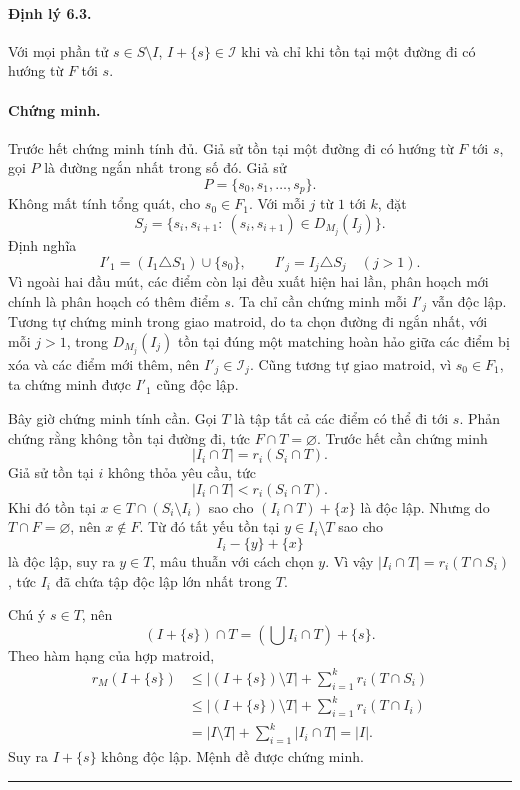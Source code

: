 \documentclass[11pt]{article}
\newcommand{\qedmark}{\hfill\rule{0.7ex}{0.7ex}}
\begin{document}
\paragraph{Định lý 6.3.}
Với mọi phần tử \(s\in S\setminus I\), \(I+\{s\}\in\mathcal I\) khi và chỉ khi
tồn tại một đường đi có hướng từ \(F\) tới \(s\).

\paragraph{Chứng minh.}
Trước hết chứng minh tính đủ. Giả sử tồn tại một đường đi có hướng từ \(F\) tới
\(s\), gọi \(P\) là đường ngắn nhất trong số đó. Giả sử
\[
  P=\{s_0,s_1,\ldots,s_p\}.
\]
Không mất tính tổng quát, cho \(s_0\in F_1\). Với mỗi \(j\) từ \(1\) tới \(k\),
đặt
\[
  S_j=\{s_i,s_{i+1}:\ (s_i,s_{i+1})\in D_{M_j}(I_j)\}.
\]
Định nghĩa
\[
  I'_1=(I_1\triangle S_1)\cup\{s_0\},\qquad
  I'_j=I_j\triangle S_j\quad(j>1).
\]
Vì ngoài hai đầu mút, các điểm còn lại đều xuất hiện hai lần, phân hoạch mới
chính là phân hoạch có thêm điểm \(s\). Ta chỉ cần chứng minh mỗi \(I'_j\) vẫn
độc lập. Tương tự chứng minh trong giao matroid, do ta chọn đường đi ngắn nhất,
với mỗi \(j>1\), trong \(D_{M_j}(I_j)\) tồn tại đúng một matching hoàn hảo giữa
các điểm bị xóa và các điểm mới thêm, nên \(I'_j\in\mathcal I_j\). Cũng tương tự
giao matroid, vì \(s_0\in F_1\), ta chứng minh được \(I'_1\) cũng độc lập.

Bây giờ chứng minh tính cần. Gọi \(T\) là tập tất cả các điểm có thể đi tới
\(s\). Phản chứng rằng không tồn tại đường đi, tức \(F\cap T=\varnothing\).
Trước hết cần chứng minh
\[
  |I_i\cap T|=r_i(S_i\cap T).
\]
Giả sử tồn tại \(i\) không thỏa yêu cầu, tức
\[
  |I_i\cap T|<r_i(S_i\cap T).
\]
Khi đó tồn tại \(x\in T\cap(S_i\setminus I_i)\) sao cho
\((I_i\cap T)+\{x\}\) là độc lập. Nhưng do \(T\cap F=\varnothing\), nên
\(x\notin F\). Từ đó tất yếu tồn tại \(y\in I_i\setminus T\) sao cho
\[
  I_i-\{y\}+\{x\}
\]
là độc lập, suy ra \(y\in T\), mâu thuẫn với cách chọn \(y\). Vì vậy
\(|I_i\cap T|=r_i(T\cap S_i)\), tức \(I_i\) đã chứa tập độc lập lớn nhất trong
\(T\).

Chú ý \(s\in T\), nên
\[
  (I+\{s\})\cap T=\left(\bigcup I_i\cap T\right)+\{s\}.
\]
Theo hàm hạng của hợp matroid,
\[
\begin{aligned}
r_M(I+\{s\})
  &\le |(I+\{s\})\setminus T|+\sum_{i=1}^k r_i(T\cap S_i)\\
  &\le |(I+\{s\})\setminus T|+\sum_{i=1}^k r_i(T\cap I_i)\\
  &= |I\setminus T|+\sum_{i=1}^k |I_i\cap T|=|I|.
\end{aligned}
\]
Suy ra \(I+\{s\}\) không độc lập. Mệnh đề được chứng minh. \qedmark
\end{document}
